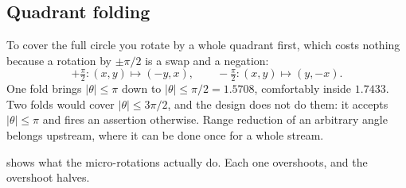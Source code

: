 \subsection{Quadrant folding}

To cover the full circle you rotate by a whole quadrant first, which costs
nothing because a rotation by $\pm\pi/2$ is a swap and a negation:
\[
  +\tfrac{\pi}{2}: (x,y) \mapsto (-y, x) , \qquad
  -\tfrac{\pi}{2}: (x,y) \mapsto (y, -x) .
\]
One fold brings $|\theta| \le \pi$ down to $|\theta| \le \pi/2 = 1.5708$,
comfortably inside $1.7433$. Two folds would cover $|\theta| \le 3\pi/2$, and
the design does not do them: it accepts $|\theta| \le \pi$ and fires an
assertion otherwise. Range reduction of an arbitrary angle belongs upstream,
where it can be done once for a whole stream.

 shows what the micro-rotations actually do. Each one
overshoots, and the overshoot halves.

